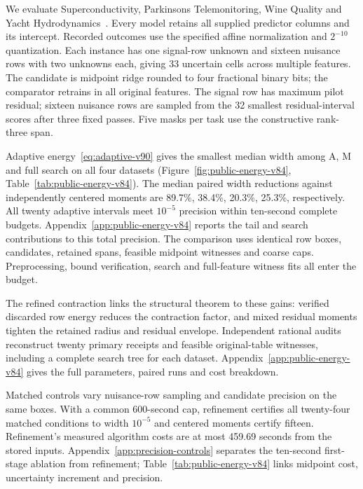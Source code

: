 We evaluate Superconductivity, Parkinsons Telemonitoring, Wine Quality and Yacht Hydrodynamics~\citep{uci_super,uci_parkinsons,uci_wine,uci_yacht}. Every model retains all supplied predictor columns and its intercept. Recorded outcomes use the specified affine normalization and $2^{-10}$ quantization. Each instance has one signal-row unknown and sixteen nuisance rows with two unknowns each, giving 33 uncertain cells across multiple features. The candidate is midpoint ridge rounded to four fractional binary bits; the comparator retrains in all original features. The signal row has maximum pilot residual; sixteen nuisance rows are sampled from the 32 smallest residual-interval scores after three fixed passes. Five masks per task use the constructive rank-three span.

Adaptive energy~\eqref{eq:adaptive-v90} gives the smallest median width among A, M and full search on all four datasets (Figure~\ref{fig:public-energy-v84}, Table~\ref{tab:public-energy-v84}). The median paired width reductions against independently centered moments are 89.7\%, 38.4\%, 20.3\%, 25.3\%, respectively. All twenty adaptive intervals meet $10^{-5}$ precision within ten-second complete budgets. Appendix~\ref{app:public-energy-v84} reports the tail and search contributions to this total precision. The comparison uses identical row boxes, candidates, retained spans, feasible midpoint witnesses and coarse caps. Preprocessing, bound verification, search and full-feature witness fits all enter the budget.

The refined contraction links the structural theorem to these gains: verified discarded row energy reduces the contraction factor, and mixed residual moments tighten the retained radius and residual envelope. Independent rational audits reconstruct twenty primary receipts and feasible original-table witnesses, including a complete search tree for each dataset. Appendix~\ref{app:public-energy-v84} gives the full parameters, paired runs and cost breakdown.

Matched controls vary nuisance-row sampling and candidate precision on the same boxes. With a common 600-second cap, refinement certifies all twenty-four matched conditions to width $10^{-5}$ and centered moments certify fifteen. Refinement's measured algorithm costs are at most 459.69 seconds from the stored inputs. Appendix~\ref{app:precision-controls} separates the ten-second first-stage ablation from refinement; Table~\ref{tab:public-energy-v84} links midpoint cost, uncertainty increment and precision.

